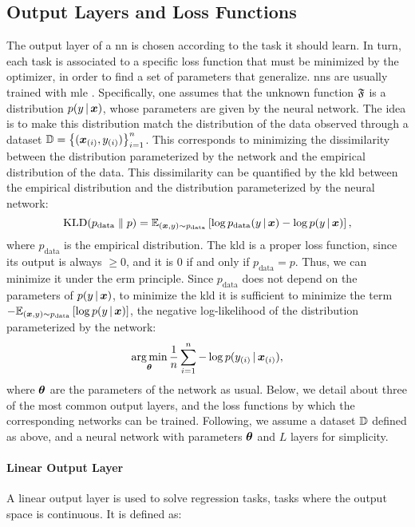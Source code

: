 \subsection{Output Layers and Loss Functions}\label{sec:loss}
The output layer of a \gls{nn} is chosen according to the task it should learn. In turn, each task is associated to a specific loss function that must be minimized by the optimizer, in order to find a set of parameters that generalize. \glspl{nn} are usually trained with \gls{mle} \citep{hastie2009elements}. Specifically, one assumes that the unknown function $\mathfrak{F}$ is a distribution $p(y\given\Vector{x})$, whose parameters are given by the neural network. The idea is to make this distribution match the distribution of the data observed through a dataset $\Data = \Set{(\PatternVector{x}{i}, \Pattern{y}{i})}_{i=1}^n$. This corresponds to minimizing the dissimilarity between the distribution parameterized by the network and the empirical distribution of the data. This dissimilarity can be quantified by the \gls{kld} between the empirical distribution and the distribution parameterized by the neural network:
$$\KLD{p_{\mathrm{data}}}{p} = \Expectation{(\Vector{x}, y) \sim p_{\mathrm{data}}}{\log p_{\mathrm{data}}(y \given \Vector{x}) - \log p(y \given \Vector{x})},$$
where $p_{\mathrm{data}}$ is the empirical distribution. The \gls{kld} is a proper loss function, since its output is always $\ge 0$, and it is 0 if and only if $p_{\mathrm{data}} = p$. Thus, we can minimize it under the \gls{erm} principle. Since $p_{\mathrm{data}}$ does not depend on the parameters of $p(y \given \Vector{x})$, to minimize the \gls{kld} it is sufficient to minimize the term $- \Expectation{(\Vector{x}, y) \sim p_{\mathrm{data}}}{\log p(y \given \Vector{x})}$, \ie the negative log-likelihood of the distribution parameterized by the network:
$$\argmin_{\Param} \frac{1}{n} \sum_{i=1}^n -\log p(\Pattern{y}{i} \given \PatternVector{x}{i}),$$
where $\boldsymbol{\theta}$ are the parameters of the network as usual. Below, we detail about three of the most common output layers, and the loss functions by which the corresponding networks can be trained. Following, we assume a dataset $\mathbb{D}$ defined as above, and a neural network with parameters $\boldsymbol{\theta}$ and $L$ layers for simplicity.

\paragraph{Linear Output Layer}
A linear output layer is used to solve regression tasks, \ie tasks where the output space is continuous. It is defined as:

